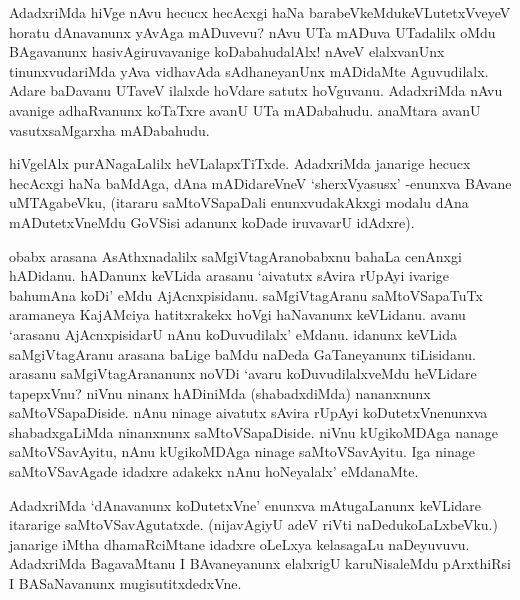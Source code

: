 AdadxriMda hiVge nAvu hecucx hecAcxgi haNa barabeVkeMdukeVLutetxVveyeV horatu dAnavanunx yAvAga mADuvevu? nAvu UTa mADuva UTadalilx oMdu BAgavanunx hasivAgiruvavanige koDabahudalAlx! nAveV elalxvanUnx tinunxvudariMda yAva vidhavAda sAdhaneyanUnx mADidaMte Aguvudilalx. Adare baDavanu UTaveV ilalxde hoVdare satutx hoVguvanu. AdadxriMda nAvu avanige adhaRvanunx koTaTxre avanU UTa mADabahudu. anaMtara avanU vasutxsaMgarxha mADabahudu.

hiVgelAlx purANagaLalilx heVLalapxTiTxde. AdadxriMda janarige hecucx hecAcxgi haNa baMdAga, dAna mADidareVneV `sherxVyasusx' -enunxva BAvane uMTAgabeVku, (itararu saMtoVSapaDali enunxvudakAkxgi modalu dAna mADutetxVneMdu GoVSisi adanunx koDade iruvavarU idAdxre).

obabx arasana AsAthxnadalilx saMgiVtagAranobabxnu bahaLa cenAnxgi hADidanu. hADanunx keVLida arasanu `aivatutx sAvira rUpAyi ivarige bahumAna koDi' eMdu AjAcnxpisidanu. saMgiVtagAranu saMtoVSapaTuTx aramaneya KajAMciya hatitxrakekx hoVgi haNavanunx keVLidanu. avanu `arasanu AjAcnxpisidarU nAnu koDuvudilalx' eMdanu. idanunx keVLida saMgiVtagAranu arasana baLige baMdu naDeda GaTaneyanunx tiLisidanu. arasanu saMgiVtagArananunx noVDi `avaru koDuvudilalxveMdu heVLidare tapepxVnu? niVnu ninanx hADiniMda (shabadxdiMda) nananxnunx saMtoVSapaDiside. nAnu ninage aivatutx sAvira rUpAyi koDutetxVnenunxva shabadxgaLiMda ninanxnunx saMtoVSapaDiside. niVnu kUgikoMDAga nanage saMtoVSavAyitu, nAnu kUgikoMDAga ninage saMtoVSavAyitu. Iga ninage saMtoVSavAgade idadxre adakekx nAnu hoNeyalalx' eMdanaMte.

AdadxriMda `dAnavanunx koDutetxVne' enunxva mAtugaLanunx keVLidare itararige saMtoVSavAgutatxde.‌ (nijavAgiyU adeV riVti naDedukoLaLxbeVku.) janarige iMtha dhamaRciMtane idadxre oLeLxya kelasagaLu naDeyuvuvu. AdadxriMda BagavaMtanu I BAvaneyanunx elalxrigU karuNisaleMdu pArxthiRsi I BASaNavanunx mugisutitxdedxVne.


\endchapter
